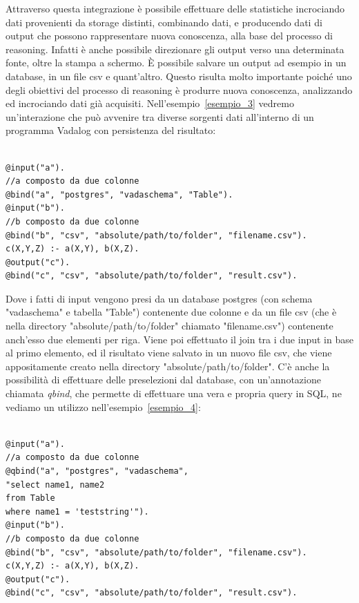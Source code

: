 Attraverso questa integrazione è possibile effettuare delle statistiche incrociando dati provenienti da storage distinti, combinando dati, e producendo dati di output che possono rappresentare nuova conoscenza, alla base del processo di reasoning. \newline
Infatti è anche possibile direzionare gli output verso una determinata fonte, oltre la stampa a schermo. È possibile salvare un output ad esempio in un database, in un file csv e quant'altro. \newline 
Questo risulta molto importante poiché uno degli obiettivi del processo di reasoning è produrre nuova conoscenza, analizzando ed incrociando dati già acquisiti. \newline 
 Nell'esempio~\ref{esempio_3} vedremo un'interazione che può avvenire tra diverse sorgenti dati all'interno di un programma Vadalog con persistenza del risultato: 
\begin{example}\label{esempio_3}
\begin{lstlisting}

@input("a"). 
//a composto da due colonne 
@bind("a", "postgres", "vadaschema", "Table"). 
@input("b"). 
//b composto da due colonne 
@bind("b", "csv", "absolute/path/to/folder", "filename.csv"). 
c(X,Y,Z) :- a(X,Y), b(X,Z). 
@output("c"). 
@bind("c", "csv", "absolute/path/to/folder", "result.csv").
\end{lstlisting}
\end{example} 
Dove i fatti di input vengono presi da un database postgres (con schema "vadaschema" e tabella "Table") contenente due colonne e da un file csv (che è nella directory "absolute/path/to/folder" chiamato "filename.csv") contenente anch'esso due elementi per riga. Viene poi effettuato il join tra i due input in base al primo elemento, ed il risultato viene salvato in un nuovo file csv, che viene appositamente creato nella directory "absolute/path/to/folder". \newline 
C'è anche la possibilità di effettuare delle preselezioni dal database, con un'annotazione chiamata \emph{qbind}, che permette di effettuare una vera e propria query in SQL, ne vediamo un utilizzo nell'esempio~\ref{esempio_4}:
\begin{example}\label{esempio_4}
\begin{lstlisting}

@input("a"). 
//a composto da due colonne 
@qbind("a", "postgres", "vadaschema", 
"select name1, name2
from Table
where name1 = 'teststring'"). 
@input("b"). 
//b composto da due colonne 
@bind("b", "csv", "absolute/path/to/folder", "filename.csv"). 
c(X,Y,Z) :- a(X,Y), b(X,Z). 
@output("c"). 
@bind("c", "csv", "absolute/path/to/folder", "result.csv").
\end{lstlisting}
\end{example} 
